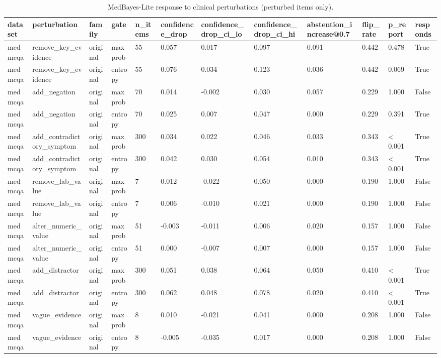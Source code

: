 \begin{table}[htbp]
\centering
\caption{MedBayes-Lite response to clinical perturbations (perturbed items only).}
\label{tab:rev_perturbation_response_mbl_applied}
\begin{tabular}{llllllllllll}
\toprule
dataset & perturbation & family & gate & n\_items & confidence\_drop & confidence\_drop\_ci\_lo & confidence\_drop\_ci\_hi & abstention\_increase@0.7 & flip\_rate & p\_report & responds \\
\midrule
medmcqa & remove\_key\_evidence & original & maxprob & 55 & 0.057 & 0.017 & 0.097 & 0.091 & 0.442 & 0.478 & True \\
medmcqa & remove\_key\_evidence & original & entropy & 55 & 0.076 & 0.034 & 0.123 & 0.036 & 0.442 & 0.069 & True \\
medmcqa & add\_negation & original & maxprob & 70 & 0.014 & -0.002 & 0.030 & 0.057 & 0.229 & 1.000 & False \\
medmcqa & add\_negation & original & entropy & 70 & 0.025 & 0.007 & 0.047 & 0.000 & 0.229 & 0.391 & True \\
medmcqa & add\_contradictory\_symptom & original & maxprob & 300 & 0.034 & 0.022 & 0.046 & 0.033 & 0.343 & < 0.001 & True \\
medmcqa & add\_contradictory\_symptom & original & entropy & 300 & 0.042 & 0.030 & 0.054 & 0.010 & 0.343 & < 0.001 & True \\
medmcqa & remove\_lab\_value & original & maxprob & 7 & 0.012 & -0.022 & 0.050 & 0.000 & 0.190 & 1.000 & False \\
medmcqa & remove\_lab\_value & original & entropy & 7 & 0.006 & -0.010 & 0.021 & 0.000 & 0.190 & 1.000 & False \\
medmcqa & alter\_numeric\_value & original & maxprob & 51 & -0.003 & -0.011 & 0.006 & 0.020 & 0.157 & 1.000 & False \\
medmcqa & alter\_numeric\_value & original & entropy & 51 & 0.000 & -0.007 & 0.007 & 0.000 & 0.157 & 1.000 & False \\
medmcqa & add\_distractor & original & maxprob & 300 & 0.051 & 0.038 & 0.064 & 0.050 & 0.410 & < 0.001 & True \\
medmcqa & add\_distractor & original & entropy & 300 & 0.062 & 0.048 & 0.078 & 0.020 & 0.410 & < 0.001 & True \\
medmcqa & vague\_evidence & original & maxprob & 8 & 0.010 & -0.021 & 0.041 & 0.000 & 0.208 & 1.000 & False \\
medmcqa & vague\_evidence & original & entropy & 8 & -0.005 & -0.035 & 0.017 & 0.000 & 0.208 & 1.000 & False \\

\end{tabular}
\end{table}
